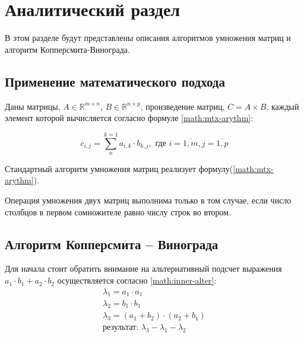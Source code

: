 \chapter{Аналитический раздел}\label{analyth}

В этом разделе будут представлены описания алгоритмов умножения матриц и алгоритм Копперсмита-Винограда.


\section{Применение математического подхода}
Даны матрицы, $A \in \mathbb{R}^{m \times n}$, $B \in \mathbb{R}^{n \times p}$, произведение матриц, $C = A \times B$, каждый элемент которой вычисляется согласно формуле \ref{math:mtx-arythm}:

\begin{equation}\label{math:mtx-arythm} 
	c_{i,j} = \sum_{n}^{k = 1}a_{i, k}\cdot b_{k, j}, \text{  где } i = \overline{1, m}, j = \overline{1, p} 
\end{equation}

\noindent Стандартный алгоритм умножения матриц реализует формулу(\ref{math:mtx-arythm}). 

Операция умножения двух матриц выполнима только в том случае, если число столбцов в первом сомножителе равно числу строк во втором.  

\section{Алгоритм Копперсмита – Винограда}
Для начала стоит обратить внимание на альтернативный подсчет выражения $a_1 \cdot b_1 + a_2 \cdot b_2$ осуществляется согласно \ref{math:inner-alter}:
\begin{equation}\label{math:inner-alter}
	\begin{array}{llll}
		\lambda_1 = a_1 \cdot a_1 \\
		\lambda_2 = b_1 \cdot b_1 \\
		\lambda_3 = (a_1 + b_2) \cdot (a_2 + b_1) \\
		\text{результат: } \lambda_3 - \lambda_1 - \lambda_2 \\ 
	\end{array}
\end{equation}

